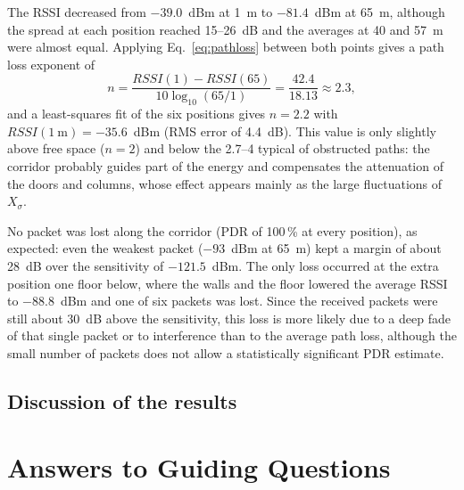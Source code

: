 \documentclass[informe,english]{plantilla}
\begin{document}
The RSSI decreased from $-39.0$~dBm at 1~m to $-81.4$~dBm at 65~m, although the spread at each position reached 15--26~dB and the averages at 40 and 57~m were almost equal. Applying Eq.~\eqref{eq:pathloss} between both points gives a path loss exponent of
\begin{equation}
    n = \frac{RSSI(1) - RSSI(65)}{10\log_{10}(65/1)} = \frac{42.4}{18.13} \approx 2.3,
\end{equation}
and a least-squares fit of the six positions gives $n = 2.2$ with $RSSI(1~\text{m}) = -35.6$~dBm (RMS error of 4.4~dB). This value is only slightly above free space ($n = 2$) and below the 2.7--4 typical of obstructed paths: the corridor probably guides part of the energy and compensates the attenuation of the doors and columns, whose effect appears mainly as the large fluctuations of $X_\sigma$.

No packet was lost along the corridor (PDR of 100\,\% at every position), as expected: even the weakest packet ($-93$~dBm at 65~m) kept a margin of about 28~dB over the sensitivity of $-121.5$~dBm. The only loss occurred at the extra position one floor below, where the walls and the floor lowered the average RSSI to $-88.8$~dBm and one of six packets was lost. Since the received packets were still about 30~dB above the sensitivity, this loss is more likely due to a deep fade of that single packet or to interference than to the average path loss, although the small number of packets does not allow a statistically significant PDR estimate.

\subsection{Discussion of the results}
\section{Answers to Guiding Questions}
\label{sec:questions}
\end{document}
